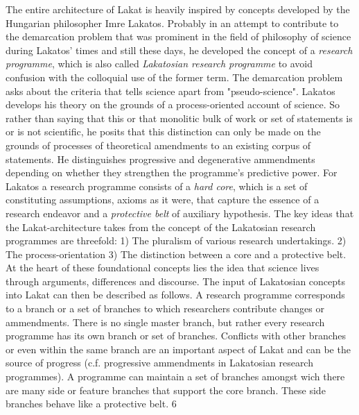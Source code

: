 \documentclass[14pt]{article}
\begin{document}
The entire architecture of Lakat is heavily inspired by concepts developed by the Hungarian philosopher Imre Lakatos. Probably in an attempt to contribute to the demarcation problem that was prominent in the field of philosophy of science during Lakatos' times and still these days, he developed the concept of a \textit{research programme}, which is also called \textit{Lakatosian research programme} to avoid confusion with the colloquial use of the former term. The demarcation problem asks about the criteria that tells science apart from "pseudo-science".  Lakatos develops his theory on the grounds of a process-oriented account of science. So rather than saying that this or that monolitic bulk of work or set of statements is or is not scientific, he posits that this distinction can only be made on the grounds of processes of theoretical amendments to an existing corpus of statements. He distinguishes progressive and degenerative ammendments depending on whether they strengthen the programme's predictive power. For Lakatos a research programme consists of a \textit{hard core}, which is a set of constituting assumptions, axioms as it were, that capture the essence of a research endeavor and a \textit{protective belt} of auxiliary hypothesis. The key ideas that the Lakat-architecture takes from the concept of the Lakatosian research programmes are threefold: 1) The pluralism of various research undertakings. 2) The process-orientation 3) The distinction between a core and a protective belt. At the heart of these foundational concepts lies the idea that science lives through arguments, differences and discourse. The input of Lakatosian concepts into Lakat can then be described as follows. A research programme corresponds to a branch or a set of branches to which researchers contribute changes or ammendments. There is no single master branch, but rather every research programme has its own branch or set of branches. Conflicts with other branches or even within the same branch are an important aspect of Lakat and can be the source of progress (c.f. progressive ammendments in Lakatosian research programmes). A programme can maintain a set of branches amongst wich there are many side or feature branches that support the core branch. These side branches behave like a protective belt.  6

\end{document}
